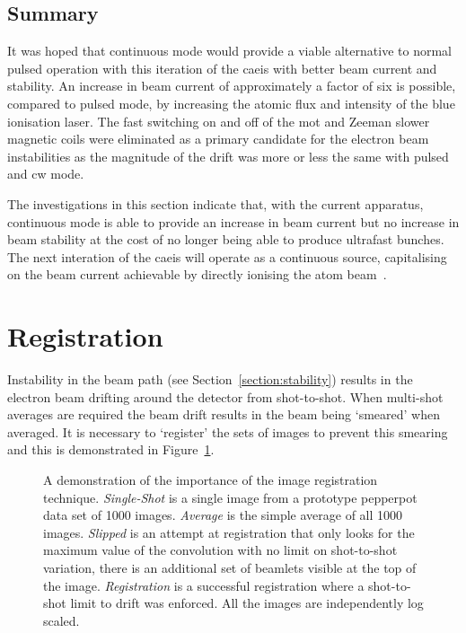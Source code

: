 \subsection{Summary}

It was hoped that continuous mode would provide a viable alternative to normal pulsed operation with this iteration of the \gls{caeis} with better beam current and stability.
An increase in beam current of approximately a factor of six is possible, compared to pulsed mode, by increasing the atomic flux and intensity of the blue ionisation laser.
The fast switching on and off of the \gls{mot} and Zeeman slower magnetic coils were eliminated as a primary candidate for the electron beam instabilities as the magnitude of the drift was more or less the same with pulsed and \gls{cw} mode.

The investigations in this section indicate that, with the current apparatus, continuous mode is able to provide an increase in beam current but no increase in beam stability at the cost of no longer being able to produce ultrafast bunches.
The next interation of the \gls{caeis} will operate as a continuous source, capitalising on the beam current achievable by directly ionising the atom beam~\cite{mcculloch_heralded_2018}.

\section{Registration}\label{section:registration}

Instability in the beam path (see Section~\ref{section:stability}) results in the electron beam drifting around the detector from shot-to-shot.
When multi-shot averages are required the beam drift results in the beam being `smeared' when averaged.
It is necessary to `register' the sets of images to prevent this smearing and this is demonstrated in Figure~\ref{figure:registration_examples}.

\begin{figure}
    \center
    
    \caption[Image registration examples.]{A demonstration of the importance of the image registration technique. \emph{Single-Shot} is a single image from a prototype pepperpot data set of 1000 images. \emph{Average} is the simple average of all 1000 images. \emph{Slipped} is an attempt at registration that only looks for the maximum value of the convolution with no limit on shot-to-shot variation, there is an additional set of beamlets visible at the top of the image. \emph{Registration} is a successful registration where a shot-to-shot limit to drift was enforced. All the images are independently log scaled.}
    \label{figure:registration_examples}
\end{figure}

